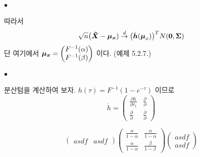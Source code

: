 \documentclass[12pt,oneside,english]{book}
\def\ck{\paragraph{\Large$\bullet$}\Large}
\newcommand{\bs}[1]{\mbox{\boldmath $#1$}}
\begin{document}
\ck 따라서 
\[
\sqrt{n}\big(\bs{\tilde X}-\bs{\mu_x})\overset{d}{\to} \big({\dot{\bs h}}({\bs\mu_x})\big)^T N({\bs 0},{\bs \Sigma})
\]
단 여기에서 $\bs{\mu_x}=\begin{pmatrix} F^{-1}(\alpha)\\ F^{-1}(\beta) \end{pmatrix}$ 이다. (예제 5.2.7.)

\ck 분산텀을 계산하여 보자. $h(\tau)=F^{-1}(1-e^{-\tau})$ 이므로 
\[
\dot{h}= \begin{pmatrix}\frac{\partial h}{\partial\tau_1} & \frac{\partial}{\partial} \\ \frac{\partial}{\partial} & \frac{\partial}{\partial} \end{pmatrix}
\]


\[
\begin{pmatrix} asdf & asdf \end{pmatrix}\begin{pmatrix}\frac{\alpha}{1-\alpha} & \frac{\alpha}{1-\alpha} \\ \frac{\alpha}{1-\alpha} & \frac{\beta}{1-\beta} \end{pmatrix}\begin{pmatrix} asdf \\ asdf \end{pmatrix}
\]
\end{document}

